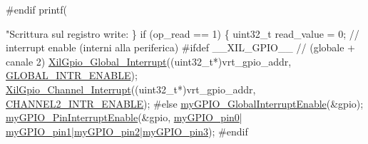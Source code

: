 \begin{DoxyCodeInclude}
{{{\textcolor{preprocessor}{#endif}
        printf(\textcolor{stringliteral}{"Scrittura sul registro write: %
    \}
    \textcolor{keywordflow}{if} (op\_read == 1) \{
        uint32\_t read\_value = 0;
        \textcolor{comment}{// interrupt enable (interni alla periferica)}
\textcolor{preprocessor}{        #ifdef \_\_XIL\_GPIO\_\_}
        \textcolor{comment}{// (globale + canale 2)}
        \hyperlink{xil__gpio_8c_aac9ff33f07964a1f5f9b8b1173072d67}{XilGpio\_Global\_Interrupt}((uint32\_t*)vrt\_gpio\_addr, 
      \hyperlink{xil__gpio_8h_adede88fc60bf8fc2dd1df41223bcaab2}{GLOBAL\_INTR\_ENABLE});
        \hyperlink{xil__gpio_8c_ab335ddab38389969b7a1fdb226eb1fbf}{XilGpio\_Channel\_Interrupt}((uint32\_t*)vrt\_gpio\_addr, 
      \hyperlink{xil__gpio_8h_a09e472673cd2e996bc6cb7d60fea9b9b}{CHANNEL2\_INTR\_ENABLE});
\textcolor{preprocessor}{        #else}
        \hyperlink{group__bare-metal_gada93ef6a9818e634f0a233ce14582216}{myGPIO\_GlobalInterruptEnable}(&gpio);
        \hyperlink{group__bare-metal_ga116e3a1077a317e9e42ded6dd4df64af}{myGPIO\_PinInterruptEnable}(&gpio, \hyperlink{group__bare-metal_gga402a0d20afc0cb7c25554b8b023f4253a6db6fa7be955ae379f543d96122e23a9}{myGPIO\_pin0}|
      \hyperlink{group__bare-metal_gga402a0d20afc0cb7c25554b8b023f4253a1de6bdcc01efca2c39f584f5a20293be}{myGPIO\_pin1}|\hyperlink{group__bare-metal_gga402a0d20afc0cb7c25554b8b023f4253a1fb3f52d920ac8ba17b74dd73c27d783}{myGPIO\_pin2}|\hyperlink{group__bare-metal_gga402a0d20afc0cb7c25554b8b023f4253a4514d64390392b626aa4dbfaac8dc1e5}{myGPIO\_pin3});
\textcolor{preprocessor}{        #endif}

}}}}
\end{DoxyCodeInclude}

